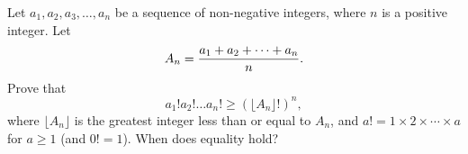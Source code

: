 Let $a_1,a_2,a_3,\ldots,a_n$ be a sequence of non-negative integers, where $n$ is a positive integer. Let \[ A_n={a_1+a_2+\cdots+a_n\over n}. \] Prove that \[ a_1!a_2!\ldots a_n!\ge\left(\lfloor A_n\rfloor !\right)^n, \] where $\lfloor A_n\rfloor$ is the greatest integer less than or equal to $A_n$, and $a!=1\times 2\times\cdots\times a$ for $a\ge 1$ (and $0!=1$). When does equality hold?